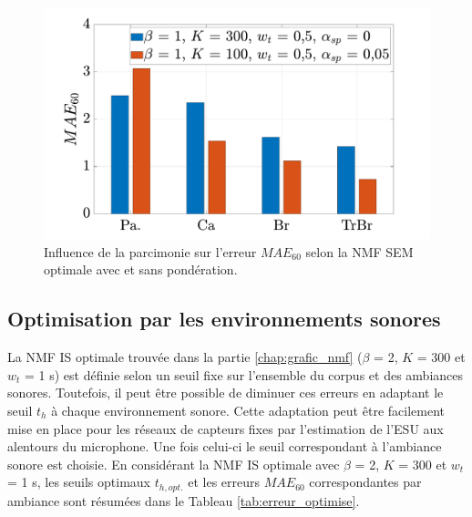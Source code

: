 \begin{figure}[h]
\centering
\includegraphics[width=.7\linewidth]{./figures/resultats/bar_sparse.pdf}
\caption{Influence de la parcimonie sur l'erreur $MAE_{60}$ selon la NMF SEM optimale avec et sans pondération.}
\end{figure}


\subsection{Optimisation par les environnements sonores}\label{part:optimisationESU}


La NMF IS optimale trouvée dans la partie \ref{chap:grafic_nmf} ($\beta$ = 2, $K$ = 300 et $w_t$ = 1 s) est définie selon un seuil fixe sur l'ensemble du corpus et des ambiances sonores. Toutefois, il peut être possible de diminuer ces erreurs en adaptant le seuil $t_h$ à chaque environnement sonore. 
Cette adaptation peut être facilement mise en place pour les réseaux de capteurs fixes par l'estimation de l'ESU aux alentours du microphone. Une fois celui-ci le seuil correspondant à l'ambiance sonore est choisie. 
En considérant la NMF IS optimale avec $\beta$ = 2, $K$ = 300 et $w_t$ = 1 s, les seuils optimaux $t_{h,opt.}$ et les erreurs $MAE_{60}$ correspondantes par ambiance sont résumées dans le Tableau \ref{tab:erreur_optimise}.

\begin{table}[h]
\centering
\caption{Erreurs $MAE_{60}$ minimales selon le seuil optimal $t_{h,opt}$ par ambiance sonore, en gras les erreurs minimales.}
\label{tab:erreur_optimise}
\end{table}

